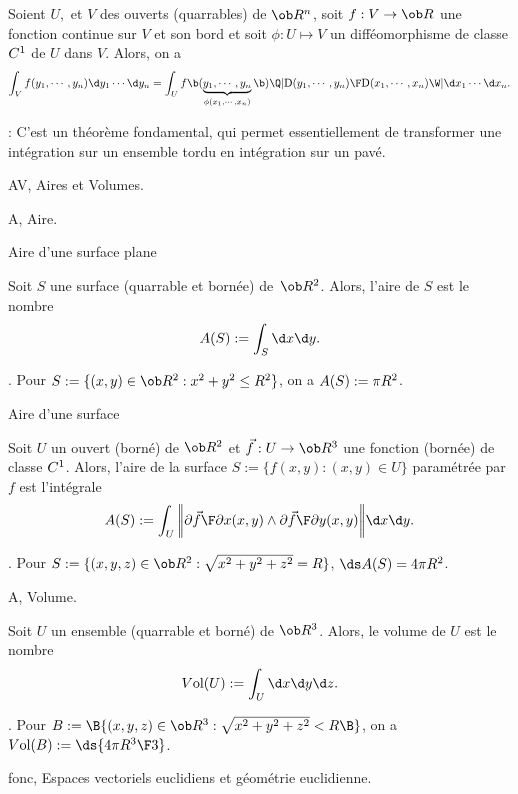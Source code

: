 \Theoreme [Title=Théorème de changement de variable] 
Soient $U,$ et $V$ des ouverts (quarrables) de $\ob R^n$, soit 
$f:V\to\ob R$ une fonction continue sur $V$ et son bord 
et soit $\phi:U\mapsto V$ un difféomorphisme de classe $\sc C^1$ de $U$ dans $V$. 
Alors, on a 
$$
\int_Vf(y_1,\cdots,y_n)\d y_1\cdots\d y_n
=\int_Uf\b(\underbrace{y_1,\cdots,y_n}_{\phi(x_1,\cdots,x_n)}\b)
\Q|{\mbox{D}(y_1,\cdots,y_n)\F\mbox{D}(x_1,\cdots,x_n)}\W|\d x_1\cdots\d x_n. 
$$

\Remarque : C'est un théorème fondamental, qui permet essentiellement de transformer 
une intégration sur un ensemble tordu en intégration sur un pavé. 
\bigskip

\Section AV, Aires et Volumes.

\Subsection A, Aire. 

\Concept Aire d'une surface plane 

\Definition [] Soit $S$ une surface (quarrable et bornée) de~$\ob R^2$. 
Alors, l'aire de $S$ est le nombre 
$$
\sc A(S):=\int_S\d x\d y. 
$$

\Exemple.  Pour $S:=\{(x,y)\in\ob R^2:x^2+y^2\le R^2\}$, on a $\sc A(S):=\pi R^2$. 
\bigskip 

\Concept Aire d'une surface

\Definition []Soit $U$ un ouvert (borné) de $\ob R^2$ et $\vec f:U\to\ob R^3$ 
une fonction (bornée) de classe $\sc C^1$. Alors, l'aire de la surface 
$S:=\{f(x,y):(x,y)\in U\}$ 
paramétrée par $f$ est l'intégrale 
$$
\sc A(S):=\int_U\bigg|\!\bigg|{\partial \vec f\F\partial x}(x,y)\wedge{\partial\vec f\F\partial y}(x,y)\bigg|\!\bigg|\d x\d y. 
$$
\smallskip

\Exemple.  Pour $S:=\{(x,y,z)\in\ob R^2:\sqrt{x^2+y^2+z^2}=R\}$, 
$\ds\sc A(S)=4\pi R^2$. 
\bigskip

\Subsection A, Volume.

\Definition []Soit $U$ un ensemble (quarrable et borné) de $\ob R^3$. Alors, le volume de $U$ est le nombre
$$
\sc V\mbox{ol}(U):=\int_U\d x\d y\d z. 
$$

\Exemple.  Pour $B:=\B\{(x,y,z)\in\ob R^3:\sqrt{x^2+y^2+z^2}<R\B\}$, on a $\sc V\mbox{ol}(B):=\ds{4\pi R^3\F3}$. 




\pagetitretrue


\Chapter fonc, Espaces vectoriels euclidiens et géométrie euclidienne. 
\bigskip


